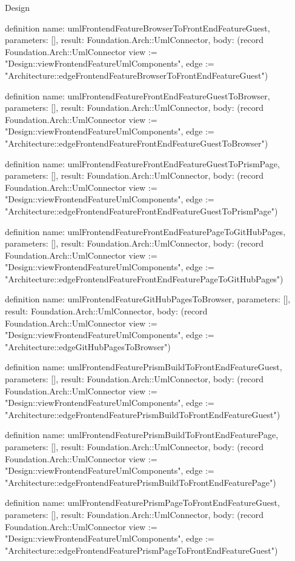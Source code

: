 \begin{lexlean}{Design}
\begin{semanticmodule}
definition{
  name: umlFrontendFeatureBrowserToFrontEndFeatureGuest,
  parameters: [],
  result: Foundation.Arch::UmlConnector,
  body: (record Foundation.Arch::UmlConnector {view := "Design::viewFrontendFeatureUmlComponents", edge := "Architecture::edgeFrontendFeatureBrowserToFrontEndFeatureGuest"})
}

definition{
  name: umlFrontendFeatureFrontEndFeatureGuestToBrowser,
  parameters: [],
  result: Foundation.Arch::UmlConnector,
  body: (record Foundation.Arch::UmlConnector {view := "Design::viewFrontendFeatureUmlComponents", edge := "Architecture::edgeFrontendFeatureFrontEndFeatureGuestToBrowser"})
}

definition{
  name: umlFrontendFeatureFrontEndFeatureGuestToPrismPage,
  parameters: [],
  result: Foundation.Arch::UmlConnector,
  body: (record Foundation.Arch::UmlConnector {view := "Design::viewFrontendFeatureUmlComponents", edge := "Architecture::edgeFrontendFeatureFrontEndFeatureGuestToPrismPage"})
}

definition{
  name: umlFrontendFeatureFrontEndFeaturePageToGitHubPages,
  parameters: [],
  result: Foundation.Arch::UmlConnector,
  body: (record Foundation.Arch::UmlConnector {view := "Design::viewFrontendFeatureUmlComponents", edge := "Architecture::edgeFrontendFeatureFrontEndFeaturePageToGitHubPages"})
}

definition{
  name: umlFrontendFeatureGitHubPagesToBrowser,
  parameters: [],
  result: Foundation.Arch::UmlConnector,
  body: (record Foundation.Arch::UmlConnector {view := "Design::viewFrontendFeatureUmlComponents", edge := "Architecture::edgeGitHubPagesToBrowser"})
}

definition{
  name: umlFrontendFeaturePrismBuildToFrontEndFeatureGuest,
  parameters: [],
  result: Foundation.Arch::UmlConnector,
  body: (record Foundation.Arch::UmlConnector {view := "Design::viewFrontendFeatureUmlComponents", edge := "Architecture::edgeFrontendFeaturePrismBuildToFrontEndFeatureGuest"})
}

definition{
  name: umlFrontendFeaturePrismBuildToFrontEndFeaturePage,
  parameters: [],
  result: Foundation.Arch::UmlConnector,
  body: (record Foundation.Arch::UmlConnector {view := "Design::viewFrontendFeatureUmlComponents", edge := "Architecture::edgeFrontendFeaturePrismBuildToFrontEndFeaturePage"})
}

definition{
  name: umlFrontendFeaturePrismPageToFrontEndFeatureGuest,
  parameters: [],
  result: Foundation.Arch::UmlConnector,
  body: (record Foundation.Arch::UmlConnector {view := "Design::viewFrontendFeatureUmlComponents", edge := "Architecture::edgeFrontendFeaturePrismPageToFrontEndFeatureGuest"})
}


\end{semanticmodule}
\end{lexlean}
